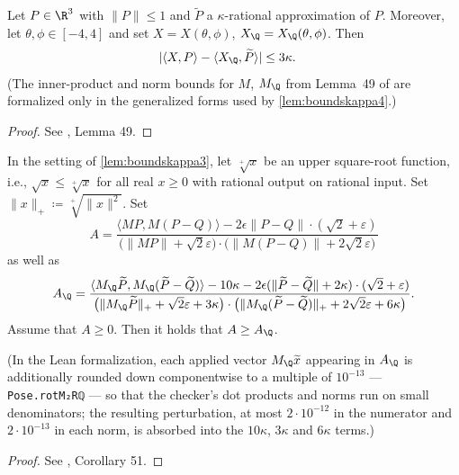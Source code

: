 \begin{lemma} \label{lem:boundskappa3}
\leanok
{}
    Let $P \in \R^3$ with $\|P\|\leq 1$ and $\widetilde{P}$ a $\kappa$-rational approximation of $P$. Moreover, let $\theta, \phi \in [-4,4]$ and set $X = X(\theta, \phi)$, $X_{\Q} = X_{\Q}(\theta, \phi)$. Then
    \begin{align}
        |\langle X, P \rangle - \langle X_{\Q}, \widetilde{P} \rangle| & \leq 3 \kappa. \label{eq:boundskappa3.1}
    \end{align}
    (The inner-product and norm bounds for $M$, $M_{\Q}$ from Lemma~49 of \cite{polyhedron.without.rupert} are formalized only in the generalized forms used by \cref{lem:boundskappa4}.)
\end{lemma}
\begin{proof}
\leanok
See \cite{polyhedron.without.rupert}, Lemma 49.
\end{proof}


\begin{corollary} \label{lem:boundskappa4}
\leanok
{}
    In the setting of \cref{lem:boundskappa3}, let $\sqrt[+]{x}$ be an upper square-root function, i.e., $\sqrt{x} \leq \sqrt[+]{x}$ for all real $x \geq 0$ with rational output on rational input. Set $\|x\|_{+} \coloneqq \sqrt[+]{\|x\|^2}$. Set
    \[
        A =  \frac{\langle M P, M(P-Q)\rangle - 2 \epsilon  \|P-Q\| \cdot  (\sqrt{2}+\varepsilon)}{ \big(\| M P\|+\sqrt{2} \varepsilon \big) \cdot \big(\|M(P-Q)\|+2 \sqrt{2} \varepsilon\big)}
    \]
    as well as
    \[
        A_{\Q} =         \frac{\langle M_{\Q} \widetilde{P}, M_{\Q} (\widetilde{P}-\widetilde{Q})\rangle - 10\kappa - 2 \epsilon ( \|\widetilde{P}-\widetilde{Q}\| + 2 \kappa ) \cdot  (\sqrt{2}+\varepsilon)}{ \big(\| M_{\Q} \widetilde{P}\|_{+}+\sqrt{2} \varepsilon + 3\kappa \big) \cdot \big(\|M_{\Q}(\widetilde{P}-\widetilde{Q})\|_{+}+2 \sqrt{2} \varepsilon + 6\kappa\big)}.
    \]
    Assume that $A \geq 0$. Then it holds that $A \geq A_{\Q}$.

    (In the Lean formalization, each applied vector $M_{\Q} \widetilde{x}$ appearing in
    $A_{\Q}$ is additionally rounded down componentwise to a multiple of $10^{-13}$
    --- \texttt{Pose.rotM₂Rℚ} --- so that the checker's dot products and norms run on
    small denominators; the resulting perturbation, at most $2 \cdot 10^{-12}$ in the
    numerator and $2 \cdot 10^{-13}$ in each norm, is absorbed into the
    $10\kappa$, $3\kappa$ and $6\kappa$ terms.)
\end{corollary}
\begin{proof}
\leanok
See \cite{polyhedron.without.rupert}, Corollary 51.
\end{proof}

